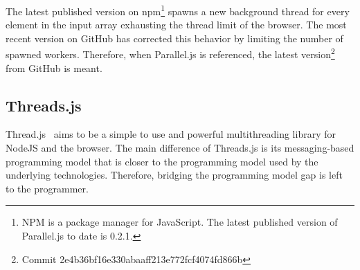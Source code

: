 \begin{remark}
The latest published version on npm\footnote{NPM is a package manager for JavaScript. The latest published version of Parallel.js to date is 0.2.1.} spawns a new background thread for every element in the input array exhausting the thread limit of the browser. The most recent version on GitHub has corrected this behavior by limiting the number of spawned workers. Therefore, when Parallel.js is referenced, the latest version\footnote{Commit 2e4b36bf16e330abaaff213e772fcf4074fd866b} from GitHub is meant.	
\end{remark}

\subsection{Threads.js}
Thread.js~\cite{Wermke2016} aims to be a simple to use and powerful multithreading library for NodeJS and the browser. The main difference of Threads.js is its messaging-based programming model that is closer to the programming model used by the underlying technologies. Therefore, bridging the programming model gap is left to the programmer.